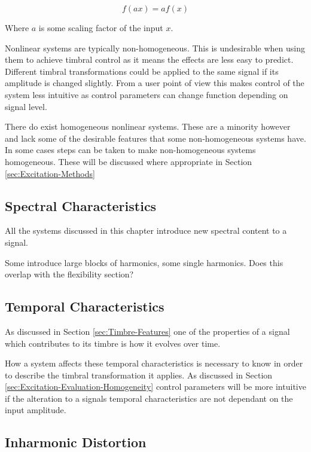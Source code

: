 		\[ f(ax) = af(x) \]

		Where $a$ is some scaling factor of the input $x$.
		
		Nonlinear systems are typically non-homogeneous. This is undesirable when using them to achieve timbral
		control as it means the effects are less easy to predict. Different timbral transformations could be applied
		to the same signal if its amplitude is changed slightly. From a user point of view this makes control of the
		system less intuitive as control parameters can change function depending on signal level.


		There do exist homogeneous nonlinear systems. These are a minority however and lack some of the desirable
		features that some non-homogeneous systems have. In some cases steps can be taken to make non-homogeneous
		systems homogeneous. These will be discussed where appropriate in Section \ref{sec:Excitation-Methods}

	\subsection{Spectral Characteristics}
	\label{sec:Excitation-Evaluation-SpectralCharacteristics}
		All the systems discussed in this chapter introduce new spectral content to a signal. 

		\note
		{
			Some introduce large blocks of harmonics, some single harmonics. Does this overlap with the
			flexibility section?
		}

	\subsection{Temporal Characteristics}
	\label{sec:Excitation-Evaluation-TemporalCharacteristics}
		As discussed in Section \ref{sec:Timbre-Features} one of the properties of a signal which
		contributes to its timbre is how it evolves over time.

		How a system affects these temporal characteristics is necessary to know in order to describe the timbral
		transformation it applies. As discussed in Section \ref{sec:Excitation-Evaluation-Homogeneity} control
		parameters will be more intuitive if the alteration to a signals temporal characteristics are not dependant
		on the input amplitude.

	\subsection{Inharmonic Distortion}
	\label{sec:Excitation-Evaluation-InharmonicDistortion}

